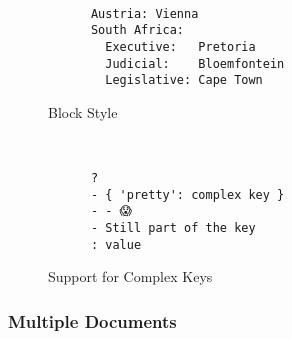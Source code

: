\begin{figure}[H]
  \begin{minipage}[t]{0.48\textwidth}
    \vspace{0pt}
    \begin{bchart}[max=9, width=0.85\textwidth]
    \end{bchart}
  \end{minipage}
  \begin{minipage}[t]{0pt}~\end{minipage}
  \begin{minipage}[t]{0.48\textwidth}
    \vspace{0pt}
    \begin{verbatim}
      Austria: Vienna
      South Africa:
        Executive:   Pretoria
        Judicial:    Bloemfontein
        Legislative: Cape Town
    \end{verbatim}
  \end{minipage}
  \caption{Block Style}
\end{figure}

\begin{figure}[H]
  \begin{minipage}[t]{0.48\textwidth}
    \vspace{0pt}
    \begin{bchart}[max=9, width=0.85\textwidth]
    \end{bchart}
  \end{minipage}
  \begin{minipage}[t]{0pt}~\end{minipage}
  \begin{minipage}[t]{0.48\textwidth}
    \vspace{0pt}
    \begin{verbatim}
      ?
      - { 'pretty': complex key }
      - - 😱
      - Still part of the key
      : value
    \end{verbatim}
  \end{minipage}
  \caption{Support for Complex Keys}
\end{figure}

\subsubsection{Multiple Documents}

